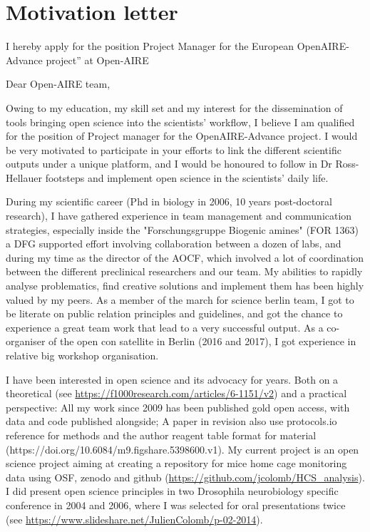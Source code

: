 \section* {Motivation letter}

I hereby apply for the position Project Manager for the European OpenAIRE-Advance project'' at Open-AIRE
\vspace {0.5cm} 

Dear Open-AIRE team,

Owing to my education, my skill set and my interest for the dissemination of tools bringing open science into the scientists' workflow, I believe I am qualified for the position of Project manager for the OpenAIRE-Advance project. I would be very motivated to participate in your efforts to link the different scientific outputs under a unique platform, and I would be honoured to follow in Dr Ross-Hellauer footsteps and implement open science in the scientists' daily life.

During my scientific career (Phd in biology in 2006, 10 years post-doctoral research), I have gathered experience in team management and communication strategies, especially inside the "Forschungsgruppe Biogenic amines" (FOR 1363) a DFG supported effort involving collaboration between a dozen of labs, and during my time as the director of the AOCF, which involved a lot of coordination between the different preclinical researchers and our team. My abilities to rapidly analyse problematics, find creative solutions and implement them has been highly valued by my peers.  As a member of the march for science berlin team, I got to be literate on public relation principles and guidelines, and got the chance to experience a great team work that lead to a very successful output. As a co-organiser of the open con satellite in Berlin (2016 and 2017), I got experience in relative big workshop organisation.

I have been interested in open science and its advocacy for years. Both on a theoretical (see \url{https://f1000research.com/articles/6-1151/v2}) and a practical perspective: All my work since 2009 has been published gold open access, with data and code published alongside; A paper in revision also use protocols.io reference for methods and the author reagent table format for material (https://doi.org/10.6084/m9.figshare.5398600.v1). My current project is an open science project aiming at creating a repository for mice home cage monitoring data using OSF, zenodo and github (\url{https://github.com/jcolomb/HCS_analysis}). I did present open science principles in two Drosophila neurobiology specific conference in 2004 and 2006, where I was selected for oral presentations twice (see \url{https://www.slideshare.net/JulienColomb/p-02-2014}). 


